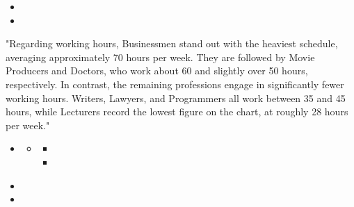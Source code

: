 \documentclass{../templateWriting/cdwriting}
\begin{document}
\begin{itemize}
\item {}
\item {}
\end{itemize}

"Regarding working hours, Businessmen stand out with the heaviest schedule, averaging approximately 70 hours per week. They are followed by Movie Producers and Doctors, who work about 60 and slightly over 50 hours, respectively. In contrast, the remaining professions engage in significantly fewer working hours. Writers, Lawyers, and Programmers all work between 35 and 45 hours, while Lecturers record the lowest figure on the chart, at roughly 28 hours per week."
\begin{itemize}
\item {}
\begin{itemize}
\item {}
\begin{itemize}
\item {}
\item {}
\end{itemize}
\end{itemize}
\end{itemize}

\begin{itemize}
\item {}
\item {}
\end{itemize}
\end{document}
